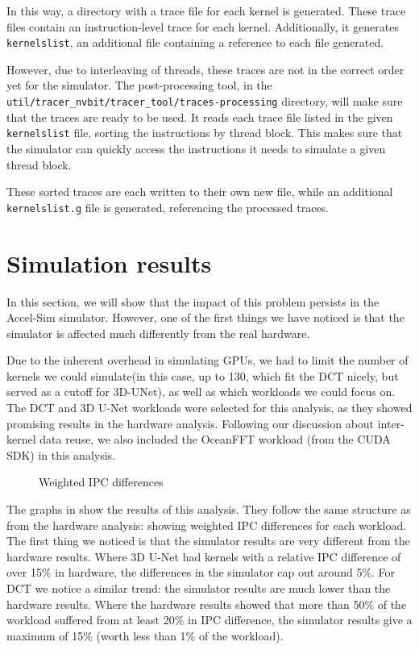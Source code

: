 In this way, a directory with a trace file for each kernel is generated.
These trace files contain an instruction-level trace for each kernel.
Additionally, it generates \verb|kernelslist|, an additional file containing a reference to each file generated.

However, due to interleaving of threads, these traces are not in the correct order yet for the simulator.
The post-processing tool, in the \verb|util/tracer_nvbit/tracer_tool/traces-processing| directory, will make sure that the traces are ready to be used.
It reads each trace file listed in the given \verb|kernelslist| file, sorting the instructions by thread block.
This makes sure that the simulator can quickly access the instructions it needs to simulate a given thread block.

These sorted traces are each written to their own new file, while an additional \verb|kernelslist.g| file is generated, referencing the processed traces.

\FloatBarrier
\section{Simulation results}\label{sec:simulation-results}
In this section, we will show that the impact of this problem persists in the Accel-Sim simulator.
However, one of the first things we have noticed is that the simulator is affected much differently from the real hardware.

Due to the inherent overhead in simulating GPUs, we had to limit the number of kernels we could simulate(in this case, up to 130, which fit the DCT nicely, but served as a cutoff for 3D-UNet), as well as which workloads we could focus on.
The DCT and 3D U-Net workloads were selected for this analysis, as they showed promising results in the hardware analysis.
Following our discussion about inter-kernel data reuse, we also included the OceanFFT workload (from the CUDA SDK) in this analysis.

\begin{figure}[ht]
    \centering
    \caption{Weighted IPC differences}
    \label{fig:sim_ipc_diff}
\end{figure}

The graphs in  show the results of this analysis.
They follow the same structure as  from the hardware analysis: showing weighted IPC differences for each workload.
The first thing we noticed is that the simulator results are very different from the hardware results.
Where 3D U-Net had kernels with a relative IPC difference of over 15\% in hardware, the differences in the simulator cap out around 5\%.
For DCT we notice a similar trend: the simulator results are much lower than the hardware results.
Where the hardware results showed that more than 50\% of the workload suffered from at least 20\% in IPC difference, the simulator results give a maximum of 15\% (worth less than 1\% of the workload).

